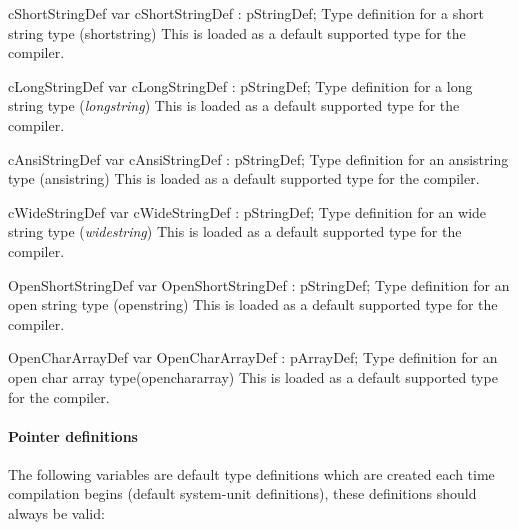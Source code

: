 \documentclass [a4paper,12pt]{article}
\begin{document}
\begin{variable}{cShortStringDef}
\Declaration
var cShortStringDef : pStringDef;
\Description
Type definition for a short string type (\textsf{shortstring})
\Notes
This is loaded as a default supported type for the compiler.
\end{variable}

\begin{variable}{cLongStringDef}
\Declaration
var cLongStringDef : pStringDef;
\Description
Type definition for a long string type (\textsf{\textit{longstring}})
\Notes
This is loaded as a default supported type for the compiler.
\end{variable}

\begin{variable}{cAnsiStringDef}
\Declaration
var cAnsiStringDef : pStringDef;
\Description
Type definition for an ansistring type (\textsf{ansistring})
\Notes
This is loaded as a default supported type for the compiler.
\end{variable}

\begin{variable}{cWideStringDef}
\Declaration
var cWideStringDef : pStringDef;
\Description
Type definition for an wide string type (\textsf{\textit{widestring}})
\Notes
This is loaded as a default supported type for the compiler.
\end{variable}

\begin{variable}{OpenShortStringDef}
\Declaration
var OpenShortStringDef : pStringDef;
\Description
Type definition for an open string type (\textsf{openstring})
\Notes
This is loaded as a default supported type for the compiler.
\end{variable}

\begin{variable}{OpenCharArrayDef}
\Declaration
var OpenCharArrayDef : pArrayDef;
\Description
Type definition for an open char array type(\textsf{openchararray})
\Notes
This is loaded as a default supported type for the compiler.
\end{variable}

\clearpage

\paragraph{Pointer definitions}

The following variables are default type definitions which are created each
time compilation begins (default system-unit definitions), these definitions
should always be valid:
\end{document}

